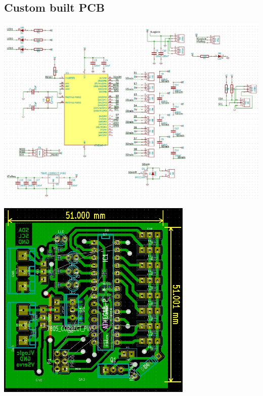 \documentclass[pdf]{beamer}
\begin{document}
\subsection{Custom built PCB}
\begin{frame}
  \begin{center}
  \includegraphics[width = \textwidth]{pics/raw/sensor_scem.png}
  \end{center}
\end{frame}

\begin{frame}
  \begin{center}
  \includegraphics[width = 0.7\textwidth]{pics/raw/serrvo_brd.png}
  \end{center}
\end{frame}
\end{document}
